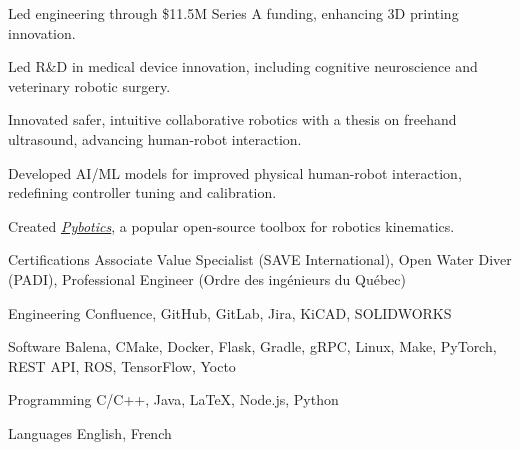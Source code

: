 \documentclass[11pt, letterpaper]{awesome-cv}
\begin{document}
\begin{cventries}
    {
        \begin{cvitems}
            \item{Led engineering through \$11.5M Series A funding, enhancing 3D printing innovation.}
        \end{cvitems}
    }

    {
        \begin{cvitems}
            \item{Led R\&D in medical device innovation, including cognitive neuroscience and veterinary robotic surgery.}
        \end{cvitems}
    }
\end{cventries}

\begin{cventries}
    {
        \begin{cvitems}
            \item{Innovated safer, intuitive collaborative robotics with a thesis on freehand ultrasound, advancing human-robot interaction.}
            \item{Developed AI/ML models for improved physical human-robot interaction, redefining controller tuning and calibration.}
            \item{Created \href{https://github.com/EngNadeau/pybotics}{\textit{Pybotics}}, a popular open-source toolbox for robotics kinematics.}
        \end{cvitems}
    }

    {
        \begin{cvitems}
        \end{cvitems}
    }
\end{cventries}


\begin{cvskills}
    \cvskill
    {Certifications}
    {
        Associate Value Specialist (SAVE International),
        Open Water Diver (PADI),
        Professional Engineer (Ordre des ingénieurs du Québec)
    }

    \cvskill
    {Engineering}
    {
        Confluence,
        GitHub,
        GitLab,
        Jira,
        KiCAD,
        SOLIDWORKS
    }

    \cvskill
    {Software}
    {
        Balena,
        CMake,
        Docker,
        Flask,
        Gradle,
        gRPC,
        Linux,
        Make,
        PyTorch,
        REST API,
        ROS,
        TensorFlow,
        Yocto
    }

    \cvskill
    {Programming}
    {
        C/C++,
        Java,
        LaTeX,
        Node.js,
        Python
    }

    \cvskill
    {Languages}
    {
        English,
        French
    }
\end{cvskills}
\end{document}
